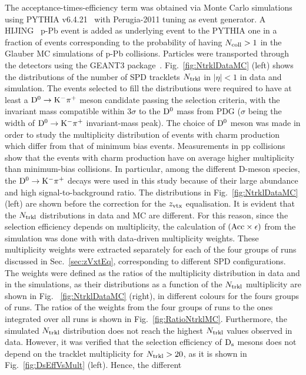 The acceptance-times-efficiency term was obtained via Monte Carlo simulations
using PYTHIA v6.4.21~\cite{Sjostrand:2006za} with Perugia-2011 tuning as event generator.  
A HIJING~\cite{Wang:1991hta} p-Pb event is added as underlying event to the PYTHIA
one in a fraction of events corresponding to the probability of having $N_{\rm coll}>1$ in the
Glauber MC simulations of p-Pb collisions. 
Particles were transported through the detectors using the GEANT3 package~\cite{Brun:1994aa}.
Fig.~\ref{fig:NtrklDataMC} (left) shows the distributions of the number of SPD tracklets $N_{\rm trkl}$ in $|\eta|<1$ in data and simulation.
The events selected to fill the distributions were required to have at least a ${\rm D^0\to K^-\pi^+}$ meson candidate 
passing the selection criteria, with the invariant mass compatible within 3$\sigma$ to the ${\rm D^0}$ mass from PDG 
($\sigma$ being the width of ${\rm D^0\to K^-\pi^+}$ invariant-mass peak).
The choice of ${\rm D^0}$ meson was made in order to study the multiplicity distribution
of events with charm production which differ from that of minimum bias events.
Measurements in pp collisions~\cite{AguilarBenitez:1988js} show that the events with charm production
have on average higher multiplicity than minimum-bias collisions.
In particular, among the different D-meson species, the ${\rm D^0\to K^-\pi^+}$ decays
were used in this study because of their large abundance and high signal-to-background ratio.
The distributions in Fig.~\ref{fig:NtrklDataMC} (left) are shown before the correction for the $z_{\rm vtx}$ equalisation. 
It is evident that the $N_{\rm trkl}$ distributions in data and MC are different.
For this reason, since the selection efficiency depends on multiplicity, the calculation
of $({\rm Acc} \times \epsilon)$ from the simulation was done with 
with data-driven multiplicity weights. These multiplicity weights were extracted
separately for each of the four groups of runs discussed in Sec.~\ref{sec:zVxtEq},
corresponding to different SPD configurations.
The weights were defined as the ratios of the multiplicity distribution in data and in 
the simulations, as their distributions as a function of the $N_{\rm trkl}$ multiplicity are shown in Fig.~	\ref{fig:NtrklDataMC} (right), in 
different colours for the fours groups of runs. The ratios of the weights from the four groups of runs to the ones integrated over
all runs is shown in Fig.~\ref{fig:RatioNtrklMC}.
Furthermore, the simulated $N_{\rm trkl}$ distribution does not reach the highest 
$N_{\rm trkl}$ values observed in data. However, it was verified 
that the selection efficiency of ${\rm D_s}$ mesons does not depend on
the tracklet multiplicity for $N_{\rm trkl} > 20$, as it is shown in Fig.~\ref{fig:DsEffVsMult} (left). Hence, the different
